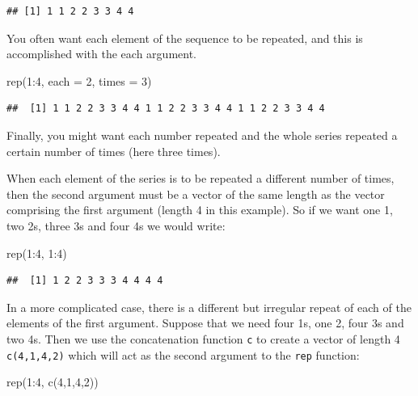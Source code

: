 \documentclass[
]{book}
\newenvironment{Shaded}{\begin{snugshade}}{\end{snugshade}}
\newcommand{\AttributeTok}[1]{\textcolor[rgb]{0.77,0.63,0.00}{#1}}
\newcommand{\DecValTok}[1]{\textcolor[rgb]{0.00,0.00,0.81}{#1}}
\newcommand{\FunctionTok}[1]{\textcolor[rgb]{0.00,0.00,0.00}{#1}}
\newcommand{\NormalTok}[1]{#1}
\newcommand{\SpecialCharTok}[1]{\textcolor[rgb]{0.00,0.00,0.00}{#1}}
\begin{document}
\begin{verbatim}
## [1] 1 1 2 2 3 3 4 4
\end{verbatim}

You often want each element of the sequence to be repeated, and this is accomplished with the each argument.

\begin{Shaded}
\begin{Highlighting}[]
\FunctionTok{rep}\NormalTok{(}\DecValTok{1}\SpecialCharTok{:}\DecValTok{4}\NormalTok{, }\AttributeTok{each =} \DecValTok{2}\NormalTok{, }\AttributeTok{times =} \DecValTok{3}\NormalTok{)}
\end{Highlighting}
\end{Shaded}

\begin{verbatim}
##  [1] 1 1 2 2 3 3 4 4 1 1 2 2 3 3 4 4 1 1 2 2 3 3 4 4
\end{verbatim}

Finally, you might want each number repeated and the whole series repeated a certain number of times (here three times).

When each element of the series is to be repeated a different number of times, then the second argument must be a vector of the same length as the vector comprising the first argument (length 4 in this example). So if we want one 1, two 2s, three 3s and four 4s we would write:

\begin{Shaded}
\begin{Highlighting}[]
\FunctionTok{rep}\NormalTok{(}\DecValTok{1}\SpecialCharTok{:}\DecValTok{4}\NormalTok{, }\DecValTok{1}\SpecialCharTok{:}\DecValTok{4}\NormalTok{)}
\end{Highlighting}
\end{Shaded}

\begin{verbatim}
##  [1] 1 2 2 3 3 3 4 4 4 4
\end{verbatim}

In a more complicated case, there is a different but irregular repeat of each of the elements of the first argument. Suppose that we need four 1s, one 2, four 3s and two 4s. Then we use the concatenation function \texttt{c} to create a vector of length 4 \texttt{c(4,1,4,2)} which will act as the second argument to the \texttt{rep} function:

\begin{Shaded}
\begin{Highlighting}[]
\FunctionTok{rep}\NormalTok{(}\DecValTok{1}\SpecialCharTok{:}\DecValTok{4}\NormalTok{, }\FunctionTok{c}\NormalTok{(}\DecValTok{4}\NormalTok{,}\DecValTok{1}\NormalTok{,}\DecValTok{4}\NormalTok{,}\DecValTok{2}\NormalTok{))}
\end{Highlighting}
\end{Shaded}
\end{document}

